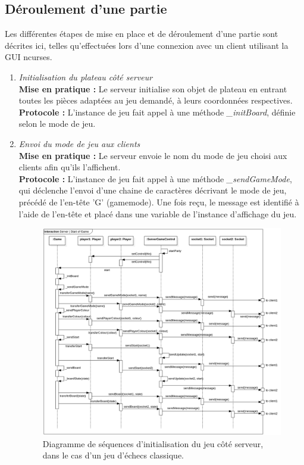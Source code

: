 \documentclass[10pt, a4paper]{article}
\begin{document}
\subsection{Déroulement d'une partie}

Les différentes étapes de mise en place et de déroulement d'une partie sont décrites ici, telles qu'effectuées lors d'une connexion avec un client utilisant la GUI ncurses.

\begin{enumerate}

\item \textit{Initialisation du plateau côté serveur}\\
\textbf{Mise en pratique :} Le serveur initialise son objet de plateau en entrant toutes les pièces adaptées au jeu demandé, à leurs coordonnées respectives.\\
\textbf{Protocole :} L'instance de jeu fait appel à une méthode \textit{\_initBoard}, définie selon le mode de jeu.

\item \textit{Envoi du mode de jeu aux clients}\\
\textbf{Mise en pratique :} Le serveur envoie le nom du mode de jeu choisi aux clients afin qu'ils l'affichent.\\
\textbf{Protocole :} L'instance de jeu fait appel à une méthode \textit{\_sendGameMode}, qui déclenche l'envoi d'une chaine de caractères décrivant le mode de jeu, précédé de l'en-tête 'G' (gamemode). Une fois reçu, le message est identifié à l'aide de l'en-tête et placé dans une variable de l'instance d'affichage du jeu.

\begin{figure} [ht]
\centering
\includegraphics[scale=0.40]{Sequence_Server_GameStart.png}
\caption{Diagramme de séquences d'initialisation du jeu côté serveur, dans le cas d'un jeu d'échecs classique.}
\end{figure}


\end{enumerate}
\end{document}
